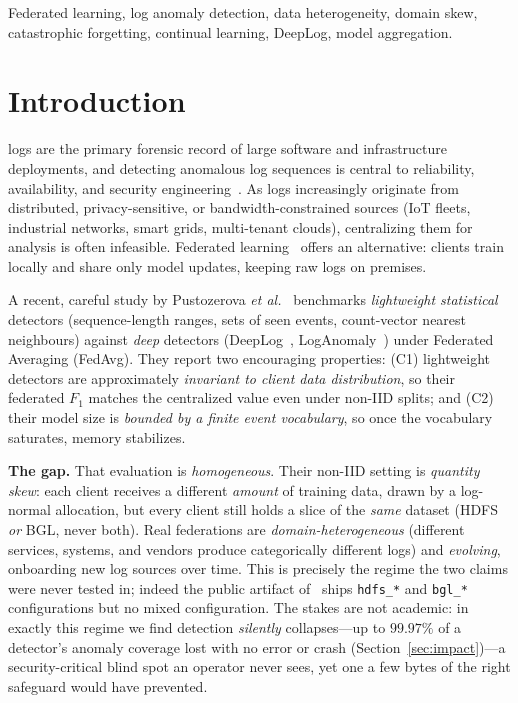 \documentclass[journal]{IEEEtran}
\begin{document}
\begin{IEEEkeywords}
Federated learning, log anomaly detection, data heterogeneity, domain skew, catastrophic
forgetting, continual learning, DeepLog, model aggregation.
\end{IEEEkeywords}

\section{Introduction}
 logs are the primary forensic record of large software and
infrastructure deployments, and detecting anomalous log sequences is central to reliability,
availability, and security engineering~\cite{he2016experience,landauer2023survey}. As logs
increasingly originate from distributed, privacy-sensitive, or bandwidth-constrained sources
(IoT fleets, industrial networks, smart grids, multi-tenant clouds), centralizing them for
analysis is often infeasible. Federated learning~\cite{mcmahan2017communication} offers an
alternative: clients train locally and share only model updates, keeping raw logs on premises.

A recent, careful study by Pustozerova \emph{et al.}~\cite{pustozerova2026lightweight}
benchmarks \emph{lightweight statistical} detectors (sequence-length ranges, sets of seen
events, count-vector nearest neighbours) against \emph{deep} detectors
(DeepLog~\cite{du2017deeplog}, LogAnomaly~\cite{meng2019loganomaly}) under Federated
Averaging (FedAvg). They report two encouraging properties: (C1) lightweight detectors are
approximately \emph{invariant to client data distribution}, so their federated $F_1$ matches the
centralized value even under non-IID splits; and (C2) their model size is \emph{bounded by a
finite event vocabulary}, so once the vocabulary saturates, memory stabilizes.

\textbf{The gap.} That evaluation is \emph{homogeneous}. Their non-IID setting is
\emph{quantity skew}: each client receives a different \emph{amount} of training data, drawn by a
log-normal allocation, but every client still holds a slice of the \emph{same} dataset (HDFS
\emph{or} BGL, never both). Real federations are \emph{domain-heterogeneous} (different services,
systems, and vendors produce categorically different logs) and \emph{evolving}, onboarding new
log sources over time. This is precisely the regime the two claims were never tested in; indeed
the public artifact of~\cite{pustozerova2026lightweight} ships \texttt{hdfs\_*} and \texttt{bgl\_*}
configurations but no mixed configuration. The stakes are not academic: in exactly this regime we find
detection \emph{silently} collapses---up to $99.97\%$ of a detector's anomaly coverage lost with no
error or crash (Section~\ref{sec:impact})---a security-critical blind spot an operator never sees, yet
one a few bytes of the right safeguard would have prevented.
\end{document}
